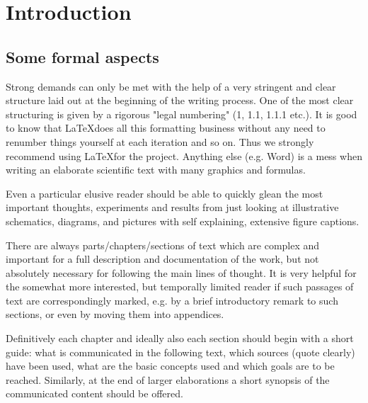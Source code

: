 %
%
%
%

\chapter{Introduction}
\label{chap:introdction}

\section{Some formal aspects}
\label{sec:formalaspects}

Strong demands can only be met with the help of a very stringent and clear structure laid out at the beginning of the writing process. One of the most clear structuring is given by a rigorous "legal numbering" (1, 1.1, 1.1.1 etc.). It is good to know that \LaTeX does all this formatting business without any need to renumber things yourself at each iteration and so on. Thus we strongly recommend using \LaTeX for the project. Anything else (e.g. Word) is a mess when writing an elaborate scientific text with many graphics and formulas.

Even a particular elusive reader should be able to quickly glean the most important thoughts, experiments and results from just looking at illustrative schematics, diagrams, and pictures with self explaining, extensive figure captions.

There are always parts/chapters/sections of text which are complex and important for a full description and documentation of the work, but not absolutely necessary for following the main lines of thought. It is very helpful for the somewhat more interested, but temporally limited reader if such passages of text are correspondingly marked, e.g. by a brief introductory remark to such sections, or even by moving them into appendices.

Definitively each chapter and ideally also each section should begin with a short guide: what is communicated in the following text, which sources (quote clearly) have been used, what are the basic concepts used and which goals are to be reached. Similarly, at the end of larger elaborations a short synopsis of the communicated content should be
offered.

